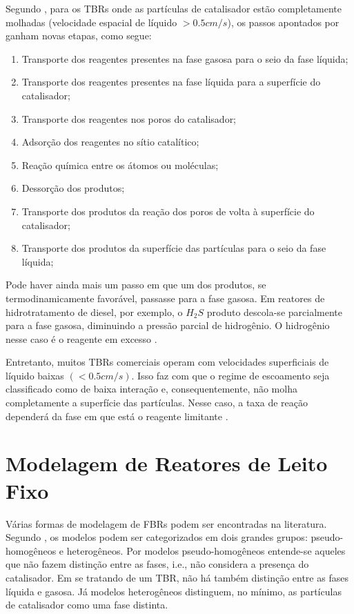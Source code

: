 Segundo , para os TBRs onde as
partículas de catalisador estão completamente molhadas (velocidade espacial de
líquido $>0.5 cm/s$), os passos apontados por  ganham
novas etapas, como segue:

\begin{enumerate}
\item Transporte dos reagentes presentes na fase gasosa para o seio da
fase líquida;
\item Transporte dos reagentes presentes na fase líquida para a superfície do
catalisador;
\item Transporte dos reagentes nos poros do catalisador;
\item Adsorção dos reagentes no sítio catalítico;
\item Reação química entre os átomos ou moléculas;
\item Dessorção dos produtos;
\item Transporte dos produtos da reação dos poros de volta à superfície do
catalisador;
\item Transporte dos produtos da superfície das partículas para o seio da fase
líquida;
\end{enumerate} 

Pode haver ainda mais um passo em que um dos produtos, se termodinamicamente
favorável, passasse para a fase gasosa. Em reatores de hidrotratamento de
diesel, por exemplo, o $H_{2}S$ produto descola-se parcialmente para a fase
gasosa, diminuindo a pressão parcial de hidrogênio. O hidrogênio nesse caso é
o reagente em excesso \cite{Ancheyta2011}.

Entretanto, muitos TBRs comerciais operam com velocidades superficiais de
líquido baixas $(<0.5 cm/s)$. Isso faz com que o regime de escoamento seja
classificado como de baixa interação e, consequentemente, não molha
completamente a superfície das partículas. Nesse caso, a taxa de reação
dependerá da fase em que está o reagente limitante \cite{Ranade2011}.

\section {Modelagem de Reatores de Leito Fixo} \label{sec:modelagemreatores}

Várias formas de modelagem de FBRs podem ser encontradas na literatura.
Segundo , os modelos podem ser categorizados em dois
grandes grupos: pseudo-homogêneos e heterogêneos. Por modelos pseudo-homogêneos
entende-se aqueles que não fazem distinção entre as fases, i.e., não considera a
presença do catalisador. Em se tratando de um TBR, não há também distinção entre
as fases líquida e gasosa. Já modelos heterogêneos distinguem, no mínimo, as
partículas de catalisador como uma fase distinta.

